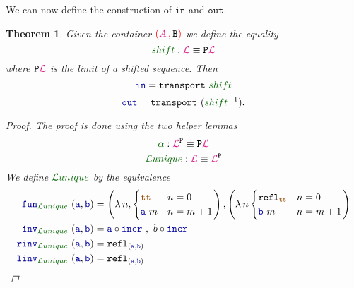 \documentclass[twoside,11pt,openright]{report}
\theoremstyle{plain} %
\newtheorem{thm}{Theorem}[section]
\theoremstyle{definition}
\theoremstyle{remark}
\newcommand*{\pathterm}[1]{\textcolor{green!40!black}{#1}}
\newcommand*{\type}[1]{\textcolor{magenta!90!black}{#1}}
\newcommand*{\containerpair}[2]{\textcolor{red}{(}#1\,\textcolor{red}{,}\,#2\textcolor{red}{)}}
\newcommand*{\constant}[1]{\textcolor{orange!60!black}{\ensuremath{\mathtt{#1}}}}
\newcommand*{\function}[1]{\textcolor{blue!60!black}{\ensuremath{\mathtt{#1}}}}
\newcommand*{\typeformer}[1]{\ensuremath{\mathtt{#1}}}
\newcommand*{\functor}[1]{\ensuremath{\mathbf{\mathtt{#1}}}}
\newcommand*{\sym}[1]{\ensuremath{#1^{-1}}}
\begin{document}
\noindent We can now define the construction of \function{in} and \function{out}.
\begin{thm}
   Given the container \(\containerpair{\type{A}}{\typeformer{B}}\) we define the equality
  \begin{equation}
    \pathterm{shift} : \type{\mathcal{L}} \equiv \functor{P}\type{\mathcal{L}}
  \end{equation}
  where \(\functor{P}\type{\mathcal{L}}\) is the limit of a shifted sequence. Then
  \begin{equation}
    \function{in} = \mathtt{transport}~\pathterm{shift}
  \end{equation}
  \begin{equation}
    \function{out} = \mathtt{transport}~(\sym{\pathterm{shift}}).
  \end{equation}
  \begin{proof}
    The proof is done using the two helper lemmas
    \begin{equation}
      \pathterm{\alpha} : \type{\mathcal{L}}^{\functor{P}} \equiv \functor{P}\type{\mathcal{L}}
    \end{equation}
    \begin{equation}
      \pathterm{\mathcal{L}unique} : \type{\mathcal{L}} \equiv \type{\mathcal{L}}^{\functor{P}}
    \end{equation}
    We define \(\pathterm{\mathcal{L}unique}\) by the equivalence
    \begin{align}
      \function{fun}_{\pathterm{\mathcal{L}unique}}~(\function{a} , \function{b}) &= \left( \lambda\,n, \begin{cases} \constant{tt} & n = 0 \\ \function{a}~m & n = m + 1 \end{cases}\right) , \left(\lambda\,n \begin{cases} \mathtt{refl}_{\constant{tt}} & n = 0 \\ \function{b}~m & n = m + 1 \end{cases}\right) \\
    \function{inv}_{\pathterm{\mathcal{L}unique}}~(\function{a} , \function{b}) &= \function{a} \circ \function{incr}~,~b \circ \function{incr} \\
    \function{rinv}_{\pathterm{\mathcal{L}unique}}~(\function{a} , \function{b}) &= \mathtt{refl}_{(\function{a},\function{b})} \\
    \function{linv}_{\pathterm{\mathcal{L}unique}}~(\function{a} , \function{b}) &= \mathtt{refl}_{(\function{a},\function{b})}
    \end{align}

\end{proof}
\end{thm}
\end{document}
